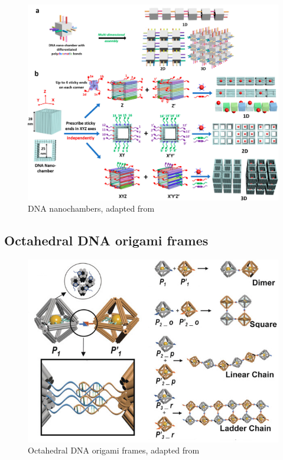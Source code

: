 \begin{figure}[h]
  \centering\includegraphics[width=\textwidth]{figures/nanochambers2.jpeg}
  \caption{DNA nanochambers, adapted from \cite{chambers_lin2020}}
\end{figure}

\subsection{Octahedral DNA origami frames}

\begin{figure}[h]
  \centering\includegraphics[width=\textwidth]{figures/tian.jpg}
  \caption{Octahedral DNA origami frames, adapted from \cite{tian_octahedra2020}}
\end{figure}


